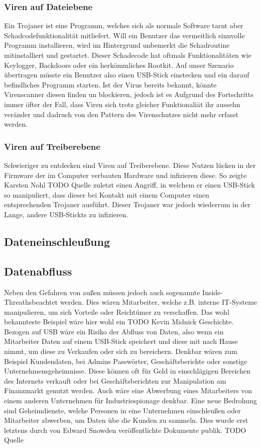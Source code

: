 			\subsubsection{Viren auf Dateiebene}
Ein Trojaner ist eine Programm, welches sich als normale Software tarnt aber Schadcodefunktionalität mitliefert. \cite{Stamp2006} Will ein Benutzer das vermeitlich sinnvolle Programm installieren, wird im Hintergrund unbemerkt die Schadroutine mitinstalliert und gestartet. Dieser Schadecode hat oftmals Funktionalitäten wie Keylogger, Backdoors oder ein herkömmliches Rootkit. Auf unser Szenario übertragen müsste ein Benutzer also einen USB-Stick einstecken und ein darauf befindliches Programm starten. Ist der Virus bereits bekannt, könnte Virenscanner diesen finden un blockieren, jedoch ist es Aufgrund des Fortschritts immer öfter der Fall, dass Viren sich trotz gleicher Funktionaliät ihr aussehn veränder und dadruch von den Pattern des Virenschutzes nicht mehr erfasst werden.
			
			\subsubsection{Viren auf Treiberebene}
Schwieriger zu entdecken sind Viren auf Treiberebene. Diese Nutzen lücken in der Firmware der im Computer verbauten Hardware und infizieren diese. So zeigte Karsten Nohl TODO Quelle zuletzt einen Angriff, in welchem er einen USB-Stick so manipuliert, dass dieser bei Kontakt mit einem Computer einen entsprechenden Trojaner ausführt. Dieser Trojaner war jedoch wiederrum in der Lange, andere USB-Stickts zu infizieren.

			\subsection{Dateneinschleußung}

			
			\subsection{Datenabfluss}
Neben den Gefahren von außen müssen jedoch auch sogenannte \glqq Inside-Threaths\grqq beachtet werden. Dies wären Mitarbeiter, welche z.B. interne IT-Systeme manipulieren, um sich Vorteile oder Reichtümer zu verschaffen. Das wohl bekannteste Beispiel wäre hier wohl ein TODO Kevin Midnick Geschichte. Bezogen auf USB wäre ein Risiko der Abfluss von Daten, also wenn ein Mitarbeiter Daten auf einem USB-Stick speichert und diese mit nach Hause nimmt, um diese zu Verkaufen oder sich zu bereichern. Denkbar wären zum Beispiel Kundendaten, bei Admins Passwörter, Geschäftsberichte oder sonstige Unternehmensgeheimnisse. Diese können oft für Geld in einschlägigen Bereichen des Internets verkauft oder bei Geschäftsberichten zur Manipulation am Finanzmarkt genutzt werden. Auch wäre eine Abwerbung eines Mitarbeiters von einem anderen Unternehmen für Industriespionage denkbar.
Eine neue Bedrohung sind Geheimdienste, welche Personen in eine Unternehmen einschleußen oder Mitarbeiter abwerben, um Daten übe die Kunden zu sammeln. Dies wurde erst letztens durch von Edward Snowden veröffentlichte Dokumente publik. TODO Quelle

